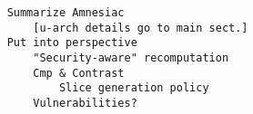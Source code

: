 \begin{verbatim}
    Summarize Amnesiac
        [u-arch details go to main sect.]
    Put into perspective 
        "Security-aware" recomputation
        Cmp & Contrast
            Slice generation policy
        Vulnerabilities?
\end{verbatim}
